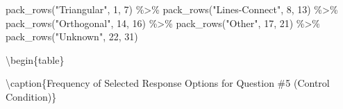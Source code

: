 \documentclass[
  letterpaper,
  DIV=11,
  numbers=noendperiod]{scrreprt}
\newenvironment{Shaded}{\begin{snugshade}}{\end{snugshade}}
\newcommand{\DecValTok}[1]{\textcolor[rgb]{0.68,0.00,0.00}{#1}}
\newcommand{\FunctionTok}[1]{\textcolor[rgb]{0.28,0.35,0.67}{#1}}
\newcommand{\NormalTok}[1]{\textcolor[rgb]{0.00,0.23,0.31}{#1}}
\newcommand{\SpecialCharTok}[1]{\textcolor[rgb]{0.37,0.37,0.37}{#1}}
\newcommand{\StringTok}[1]{\textcolor[rgb]{0.13,0.47,0.30}{#1}}
\begin{document}
\begin{Shaded}
\begin{Highlighting}[]
  \FunctionTok{pack\_rows}\NormalTok{(}\StringTok{"Triangular"}\NormalTok{, }\DecValTok{1}\NormalTok{, }\DecValTok{7}\NormalTok{) }\SpecialCharTok{\%\textgreater{}\%} 
  \FunctionTok{pack\_rows}\NormalTok{(}\StringTok{"Lines{-}Connect"}\NormalTok{, }\DecValTok{8}\NormalTok{, }\DecValTok{13}\NormalTok{) }\SpecialCharTok{\%\textgreater{}\%} 
  \FunctionTok{pack\_rows}\NormalTok{(}\StringTok{"Orthogonal"}\NormalTok{, }\DecValTok{14}\NormalTok{, }\DecValTok{16}\NormalTok{) }\SpecialCharTok{\%\textgreater{}\%} 
  \FunctionTok{pack\_rows}\NormalTok{(}\StringTok{"Other"}\NormalTok{, }\DecValTok{17}\NormalTok{, }\DecValTok{21}\NormalTok{) }\SpecialCharTok{\%\textgreater{}\%} 
  \FunctionTok{pack\_rows}\NormalTok{(}\StringTok{"Unknown"}\NormalTok{, }\DecValTok{22}\NormalTok{, }\DecValTok{31}\NormalTok{) }
\end{Highlighting}
\end{Shaded}

\textbackslash begin\{table\}

\textbackslash caption\{\label{tab:Q5-IMPASSE-RESPONSES}Frequency of
Selected Response Options for Question \#5 (Control Condition)\}
\centering
\end{document}
